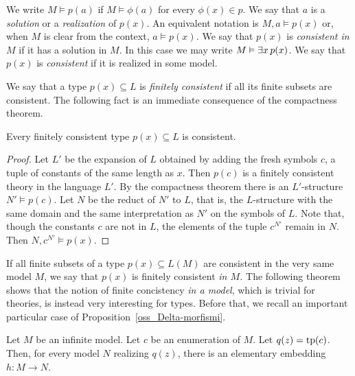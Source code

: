 We write \emph{$M\models p(a)$} if $M\models\phi(a)$ for every $\phi(x)\in p$.
We say that $a$ is a \emph{solution\/} or a \emph{realization\/} of $p(x)$.
An equivalent notation is \emph{$M,a\models p(x)$} or, when $M$ is clear from the context, \emph{$a\models p(x)$.}
We say that $p(x)$ is \emph{consistent in $M$\/} if it has a solution in $M$.
In this case we may write \emph{$M\vDash\exists x\,p(x)$.}
We say that $p(x)$ is \emph{consistent\/} if it is realized in some model.

We say that a type $p(x)\subseteq L$ is \emph{finitely consistent\/} if all its finite subsets are consistent.
The following fact is an immediate consequence of the compactness theorem.

\begin{fact}\label{fact_compattezzatipi}
Every finitely consistent type $p(x)\subseteq L$ is consistent.
\end{fact}

  \begin{proof}
  Let $L'$ be the expansion of $L$ obtained by adding the fresh symbols $c$, a tuple of constants of the same length as $x$.
  Then $p(c)$ is a finitely consistent theory in the language $L'$. By the compactness theorem there is an $L'$-structure $N'\models p(c)$.
  Let $N$ be the reduct of $N'$ to $L$, that is, the $L$-structure with the same domain and the same interpretation as $N'$ on the symbols of $L$.
  Note that, though the constants $c$ are not in $L$, the elements of the tuple $c^{N'}$ remain in $N$.
  Then $N,c^{N'}\models p(x)$.
\end{proof}

If all finite subsets of a type $p(x)\subseteq L(M)$ are consistent in the very same model $M$, we say that $p(x)$ is finitely consistent \emph{in $M$.}
The following theorem shows that the notion of finite concistency \textit{in a model}, which is trivial
for theories, is instead very interesting for types.
Before that, we recall an important particular case of Proposition~\ref{oss_Delta-morfismi}. 

\begin{lemma}\label{lem_el_diag}
    Let $M$ be an infinite model.
    Let $c$ be an enumeration of $M$.
    Let $q(z)={\rm tp}(c)$.
    Then, for every model $N$ realizing $q(z)$, there is an elementary embedding $h:M\to N$. 
\end{lemma}

